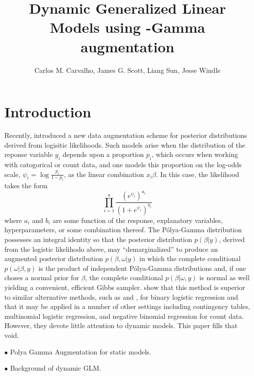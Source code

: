 \documentclass[11pt]{article}
\title{Dynamic Generalized Linear Models using \Polya-Gamma augmentation}
\author{Carlos M. Carvalho, James G. Scott, Liang Sun, Jesse Windle}
\newcommand{\Polya}{P\'{o}lya}
\newcommand{\PG}{\text{PG}}
\newcommand{\point}{\noindent $\bullet$ }
\begin{document}
\maketitle
\tableofcontents

\newpage

\section{Introduction}

Recently, \cite{polson-etal-2012} introduced a new data augmentation scheme for
posterior distributions derived from logisitic likelihoods.  Such models arise
when the distribution of the reponse variable $y_i$ depends upon a proportion
$p_i$, which occurs when working with catogorical or count data, and one models
this proportion on the log-odds scale, $\psi_i = \log \frac{p_i}{1-p_i}$, as the
linear combination $x_i \beta$.  In this case, the likelihood takes the form
\[
\prod_{i=1}^n \frac{ (e^{\psi_i})^{a_i} }{ (1 + e^{\psi_i})^{b_i} }
\]
where $a_i$ and $b_i$ are some function of the response, explanatory variables,
hyperparameters, or some combination thereof.  The \Polya-Gamma distribution
possesses an integral identity so that the posterior distribution $p(\beta |
y)$, derived from the logistic likelihodo above, may ``demarginalized'' to
produce an augmented posterior distribution $p(\beta, \omega | y)$ in which the
complete conditional $p(\omega | \beta, y)$ is the product of independent
\Polya-Gamma distributions and, if one choses a normal prior for $\beta$, the
complete conditional $p(\beta | \omega, y)$ is normal as well yielding a
convenient, efficient Gibbs sampler.  \cite{polson-etal-2012} show that this
method is superior to similar alternative methods, such as
\cite{holmes-held-2006} and \cite{fruhwirth-schnatter-fruhwirth-2007}, for
binary logistic regression and that it may be applied in a number of other
settings including contingency tables, multinomial logistic regression, and
negative binomial regression for count data.  However, they devote little
attention to dynamic models.  This paper fills that void.


\point Polya Gamma Augmentation for static models.

\point Background of dynamic GLM.
\end{document}
